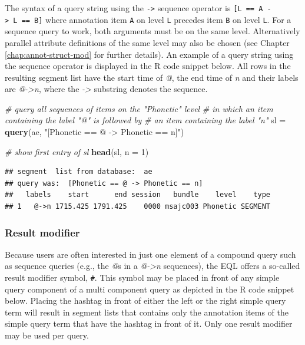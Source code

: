 \documentclass[]{book}
\newenvironment{Shaded}{\begin{snugshade}}{\end{snugshade}}
\newcommand{\CommentTok}[1]{\textcolor[rgb]{0.56,0.35,0.01}{\textit{#1}}}
\newcommand{\DataTypeTok}[1]{\textcolor[rgb]{0.13,0.29,0.53}{#1}}
\newcommand{\DecValTok}[1]{\textcolor[rgb]{0.00,0.00,0.81}{#1}}
\newcommand{\KeywordTok}[1]{\textcolor[rgb]{0.13,0.29,0.53}{\textbf{#1}}}
\newcommand{\NormalTok}[1]{#1}
\newcommand{\StringTok}[1]{\textcolor[rgb]{0.31,0.60,0.02}{#1}}
\theoremstyle{definition}
\theoremstyle{definition}
\theoremstyle{definition}
\theoremstyle{remark}
\begin{document}
The syntax of a query string using the \texttt{-\textgreater{}} sequence
operator is \texttt{{[}L\ ==\ A\ -\textgreater{}\ L\ ==\ B{]}} where
annotation item \texttt{A} on level \texttt{L} precedes item \texttt{B}
on level \texttt{L}. For a sequence query to work, both arguments must
be on the same level. Alternatively parallel attribute definitions of
the same level may also be chosen (see Chapter
\ref{chap:annot-struct-mod} for further details). An example of a query
string using the sequence operator is displayed in the R code snippet
below. All rows in the resulting segment list have the start time of
\emph{@}, the end time of \emph{n} and their labels are
\emph{@-\textgreater{}n}, where the \emph{-\textgreater{}} substring
denotes the sequence.

\begin{Shaded}
\begin{Highlighting}[]
\CommentTok{# query all sequences of items on the "Phonetic" level}
\CommentTok{# in which an item containing the label "@" is followed by}
\CommentTok{# an item containing the label "n"}
\NormalTok{sl =}\StringTok{ }\KeywordTok{query}\NormalTok{(ae, }\StringTok{"[Phonetic == @ -> Phonetic == n]"}\NormalTok{)}

\CommentTok{# show first entry of sl}
\KeywordTok{head}\NormalTok{(sl, }\DataTypeTok{n =} \DecValTok{1}\NormalTok{)}
\end{Highlighting}
\end{Shaded}

\begin{verbatim}
## segment  list from database:  ae 
## query was:  [Phonetic == @ -> Phonetic == n] 
##   labels    start      end session   bundle    level    type
## 1   @->n 1715.425 1791.425    0000 msajc003 Phonetic SEGMENT
\end{verbatim}

\hypertarget{result-modifier}{%
\subsubsection{Result modifier}\label{result-modifier}}

Because users are often interested in just one element of a compound
query such as sequence queries (e.g., the \emph{@}s in a
\emph{@-\textgreater{}n} sequences), the EQL offers a so-called result
modifier symbol, \texttt{\#}. This symbol may be placed in front of any
simple query component of a multi component query as depicted in the R
code snippet below. Placing the hashtag in front of either the left or
the right simple query term will result in segment lists that contains
only the annotation items of the simple query term that have the hashtag
in front of it. Only one result modifier may be used per query.
\end{document}
